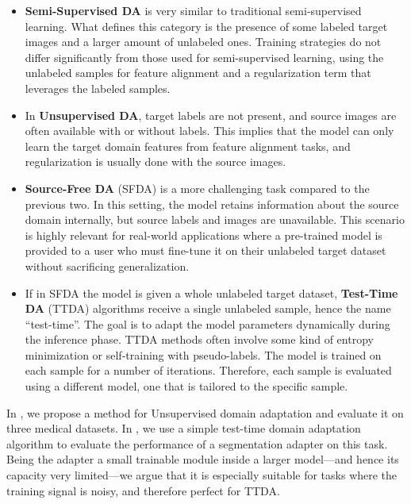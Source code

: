 \begin{itemize}
    \item \textbf{Semi-Supervised DA} is very similar to traditional semi-supervised learning. What defines this category is the presence of some labeled target images and a larger amount of unlabeled ones. Training strategies do not differ significantly from those used for semi-supervised learning, using the unlabeled samples for feature alignment and a regularization term that leverages the labeled samples.
    
    \item In \textbf{Unsupervised DA}, target labels are not present, and source images are often available with or without labels. This implies that the model can only learn the target domain features from feature alignment tasks, and regularization is usually done with the source images.
    
    \item \textbf{Source-Free DA} (SFDA) is a more challenging task compared to the previous two. In this setting, the model retains information about the source domain internally, but source labels and images are unavailable. This scenario is highly relevant for real-world applications where a pre-trained model is provided to a user who must fine-tune it on their unlabeled target dataset without sacrificing generalization.
    
    \item If in SFDA the model is given a whole unlabeled target dataset, \textbf{Test-Time DA} (TTDA) algorithms receive a single unlabeled sample, hence the name ``test-time''. The goal is to adapt the model parameters dynamically during the inference phase. TTDA methods often involve some kind of entropy minimization or self-training with pseudo-labels. The model is trained on each sample for a number of iterations. Therefore, each sample is evaluated using a different model, one that is tailored to the specific sample.
\end{itemize}

In , we propose a method for Unsupervised domain adaptation and evaluate it on three medical datasets. In , we use a simple test-time domain adaptation algorithm to evaluate the performance of a segmentation adapter on this task. Being the adapter a small trainable module inside a larger model---and hence its capacity very limited---we argue that it is especially suitable for tasks where the training signal is noisy, and therefore perfect for TTDA.